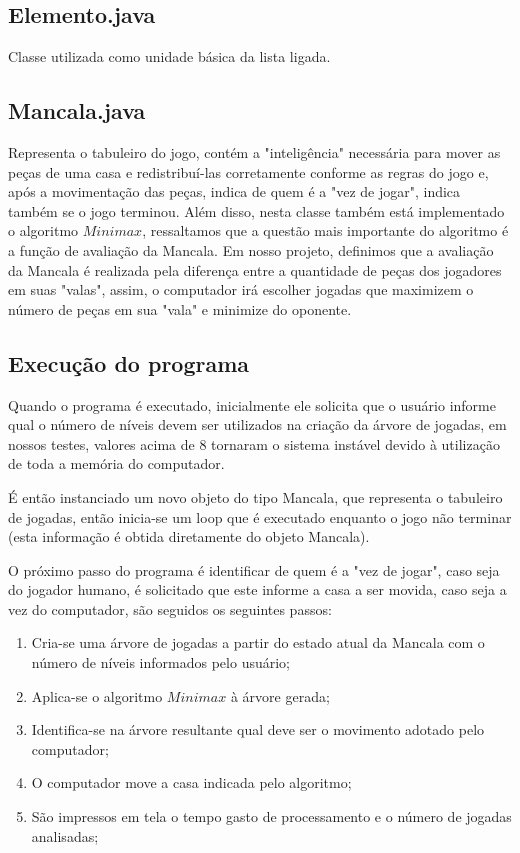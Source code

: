 \documentclass[a4paper,11pt]{article}
\begin{document}
\subsection{Elemento.java}
Classe utilizada como unidade básica da lista ligada.

\subsection{Mancala.java}
Representa o tabuleiro do jogo, contém a "inteligência" necessária para mover as peças de uma casa e redistribuí-las corretamente conforme as regras do jogo e, após a movimentação das peças, indica de quem é a "vez de jogar", indica também se o jogo terminou. Além disso, nesta classe também está implementado o algoritmo $Minimax$, ressaltamos que a questão mais importante do algoritmo é a função de avaliação da Mancala. Em nosso projeto, definimos que a avaliação da Mancala é realizada pela diferença entre a quantidade de peças dos jogadores em suas "valas", assim, o computador irá escolher jogadas que maximizem o número de peças em sua "vala" e minimize do oponente.

\subsection{Execução do programa}
Quando o programa é executado, inicialmente ele solicita que o usuário informe qual o número de níveis devem ser utilizados na criação da árvore de jogadas, em nossos testes, valores acima de 8 tornaram o sistema instável devido à utilização de toda a memória do computador.

É então instanciado um novo objeto do tipo Mancala, que representa o tabuleiro de jogadas, então inicia-se um loop que é executado enquanto o jogo não terminar (esta informação é obtida diretamente do objeto Mancala).

O próximo passo do programa é identificar de quem é a "vez de jogar", caso seja do jogador humano, é solicitado que este informe a casa a ser movida, caso seja a vez do computador, são seguidos os seguintes passos:

\begin{enumerate}
\item Cria-se uma árvore de jogadas a partir do estado atual da Mancala com o número de níveis informados pelo usuário;
\item Aplica-se o algoritmo $Minimax$ à árvore gerada;
\item Identifica-se na árvore resultante qual deve ser o movimento adotado pelo computador;
\item O computador move a casa indicada pelo algoritmo;
\item São impressos em tela o tempo gasto de processamento e o número de jogadas analisadas;
\end{enumerate}
\end{document}
